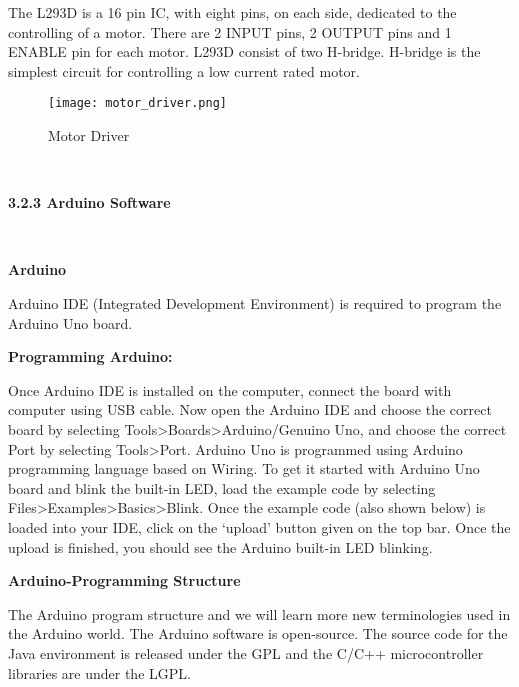\documentclass[a4paper,12pt, English]{article}
\begin{document}
\begin{normalsize}
The L293D is a 16 pin IC, with eight pins, on each side, dedicated to the controlling of a motor. There are 2 INPUT pins, 2 OUTPUT pins and 1 ENABLE pin for each motor. L293D consist of two H-bridge. H-bridge is the simplest circuit for controlling a low current rated motor.\\
\begin{figure}[htb]
\begin{center}
\texttt{[image: motor\_driver.png]}
\end{center}
\begin{center}
\renewcommand{\thefigure}{3. 2. 7}
\caption{\footnotesize Motor Driver}
\end{center}
\end{figure}\\
\begin{large}
\textbf{3.2.3 Arduino Software}
\end{large}
\\
\begin{large}
\textbf{Arduino }
\end{large}
\newline
Arduino IDE (Integrated Development Environment) is required to
program the Arduino Uno board.
\begin{large}
\textbf{Programming Arduino: }
\end{large}
\newline
Once Arduino IDE is installed on the computer, connect the board with
computer using USB cable. Now open the Arduino IDE and choose the
correct board by selecting Tools>Boards>Arduino/Genuino Uno, and
choose the correct Port by selecting Tools>Port. Arduino Uno is
programmed using Arduino programming language based on Wiring. To
get it started with Arduino Uno board and blink the built-in LED, load the
example code by selecting Files>Examples>Basics>Blink. Once the
example code (also shown below) is loaded into your IDE, click on the
‘upload’ button given on the top bar. Once the upload is finished, you
should see the Arduino built-in LED blinking.\\
\begin{large}
\textbf{Arduino-Programming Structure }
\end{large}
\newline
The Arduino program structure and we will learn more new terminologies
used in the Arduino world. The Arduino software is open-source. The
source code for the Java environment is released under the GPL and the
C/C++ microcontroller libraries are under the LGPL.\\

\end{normalsize}
\end{document}
